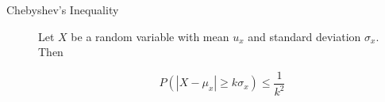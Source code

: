 \documentclass[9pt,landscape]{memoir}
\begin{document}
\begin{multicols}{3}
\begin{description}
    \item[Chebyshev's Inequality] Let $X$ be a random variable with mean $u_x$ and standard deviation $\sigma_x$. Then

        \begin{equation*}
            P(|X - \mu_x| \geq k\sigma_x) \leq \frac{1}{k^2}
        \end{equation*}
\end{description}

\end{multicols}
\end{document}
